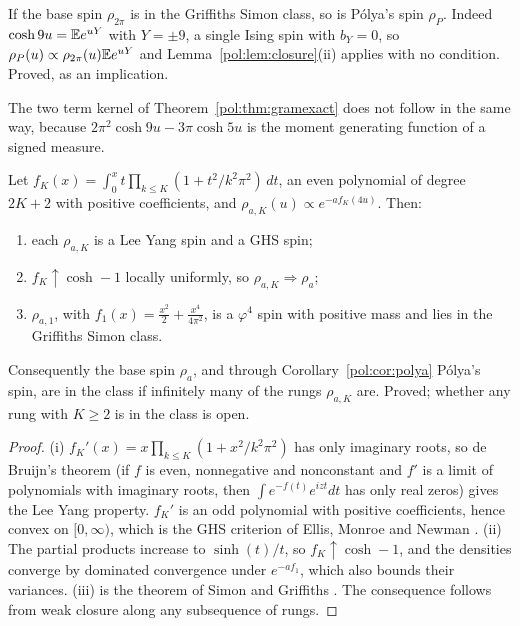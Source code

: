 \begin{corollary}\label{pol:cor:polya}
If the base spin $\rho_{2\pi}$ is in the Griffiths Simon class, so is P\'olya's spin $\rho_P$. Indeed $\cosh9u=\mathbb{E} e^{uY}$ with $Y=\pm9$, a single Ising spin with $b_Y=0$, so $\rho_P(u)\propto\rho_{2\pi}(u)\mathbb{E} e^{uY}$ and Lemma~\ref{pol:lem:closure}(ii) applies with no condition. Proved, as an implication.
\end{corollary}

The two term kernel of Theorem~\ref{pol:thm:gramexact} does not follow in the same way, because $2\pi^2\cosh9u-3\pi\cosh5u$ is the moment generating function of a signed measure.

\begin{theorem}\label{pol:thm:ladder}
Let $f_K(x)=\int_0^xt\prod_{k\le K}(1+t^2/k^2\pi^2)\,dt$, an even polynomial of degree $2K+2$ with positive coefficients, and $\rho_{a,K}(u)\propto e^{-af_K(4u)}$. Then:
\begin{enumerate}
\item[(i)] each $\rho_{a,K}$ is a Lee Yang spin and a GHS spin;
\item[(ii)] $f_K\uparrow\cosh-1$ locally uniformly, so $\rho_{a,K}\Rightarrow\rho_a$;
\item[(iii)] $\rho_{a,1}$, with $f_1(x)=\frac{x^2}2+\frac{x^4}{4\pi^2}$, is a $\varphi^4$ spin with positive mass and lies in the Griffiths Simon class.
\end{enumerate}
Consequently the base spin $\rho_a$, and through Corollary~\ref{pol:cor:polya} P\'olya's spin, are in the class if infinitely many of the rungs $\rho_{a,K}$ are. Proved; whether any rung with $K\ge2$ is in the class is open.
\end{theorem}

\begin{proof}
(i) $f_K'(x)=x\prod_{k\le K}(1+x^2/k^2\pi^2)$ has only imaginary roots, so de Bruijn's theorem \cite{deBruijn} (if $f$ is even, nonnegative and nonconstant and $f'$ is a limit of polynomials with imaginary roots, then $\int e^{-f(t)}e^{izt}dt$ has only real zeros) gives the Lee Yang property. $f_K'$ is an odd polynomial with positive coefficients, hence convex on $[0,\infty)$, which is the GHS criterion of Ellis, Monroe and Newman \cite{EMN76}. (ii) The partial products increase to $\sinh(t)/t$, so $f_K\uparrow\cosh-1$, and the densities converge by dominated convergence under $e^{-af_1}$, which also bounds their variances. (iii) is the theorem of Simon and Griffiths \cite{SimonGriffiths73}. The consequence follows from weak closure along any subsequence of rungs.
\end{proof}

